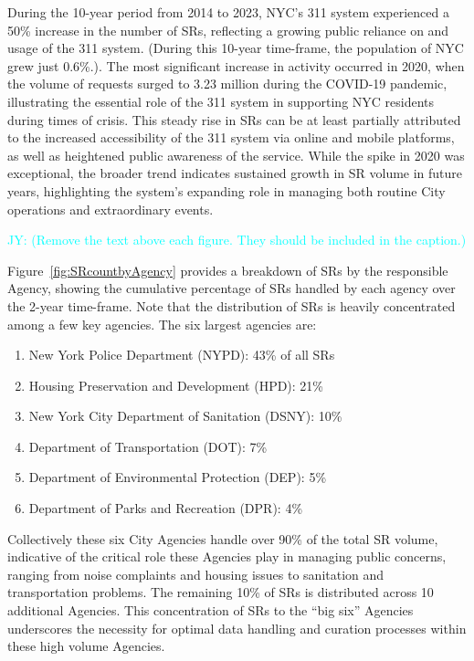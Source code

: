 \documentclass[linenumber]{jdsart}
\newcommand{\jy}[1]{\textcolor{cyan}{JY: (#1)}}
\begin{document}
During the 10-year period from 2014 to 2023,  NYC's 311 system
experienced a 50\% increase in the number of SRs, 
reflecting a growing public reliance on and usage of 
the 311 system. (During this 10\mbox{-}year time-frame, the 
population of NYC grew just 0.6\%.). The most significant increase
in activity occurred in 2020, when the volume of requests 
surged to 3.23 million during the COVID\mbox{-}19 pandemic, 
illustrating the essential role of the 311 system in supporting 
NYC residents during times of crisis. This steady 
rise in SRs can be at least partially attributed to the increased 
accessibility of the 311 system via online and mobile 
platforms, as well as heightened public awareness of the service. 
While the spike in 2020 was exceptional, the broader trend 
indicates sustained growth in SR volume in future years,  
highlighting the system's expanding role in managing 
both routine City operations and extraordinary events.


\jy{Remove the text above each figure. They should be included in the
  caption.}

Figure~\ref{fig:SRcountbyAgency} provides a breakdown of SRs by
the responsible Agency, showing the cumulative 
percentage of SRs handled by each
agency over the 2\mbox{-}year time-frame. Note that the
distribution of SRs is heavily concentrated among a few key 
agencies. The six largest agencies are:
\begin{enumerate}[left=1.5em]
    \item New York Police Department (NYPD): 43\% of all SRs
    \item Housing Preservation and Development (HPD): 21\%
    \item New York City Department of Sanitation (DSNY): 10\%
    \item Department of Transportation (DOT): 7\%
    \item Department of Environmental Protection (DEP): 5\%
    \item Department of Parks and Recreation (DPR): 4\%
\end{enumerate}


Collectively these six City Agencies handle over 90\% of the total SR 
volume, indicative of the critical role these Agencies play in managing
public concerns, ranging from noise complaints and housing issues to
sanitation and transportation problems. The remaining
10\% of SRs is distributed across 10 additional Agencies. 
This concentration of SRs to the ``big six'' Agencies 
underscores the necessity for optimal data handling and 
curation processes within these  high volume Agencies.
\end{document}
